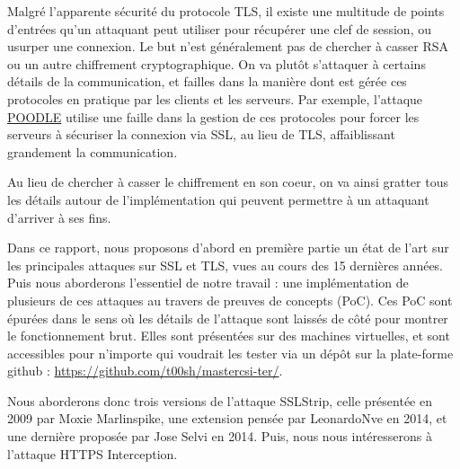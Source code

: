 Malgré l'apparente sécurité du protocole TLS, il existe une multitude de points d'entrées qu'un attaquant peut utiliser pour récupérer une clef de session, ou usurper une connexion. Le but n'est généralement pas de chercher à casser RSA ou un autre chiffrement cryptographique. On va plutôt s'attaquer à certains détails de la communication, et failles dans la manière dont est gérée ces protocoles en pratique par les clients et les serveurs. Par exemple, l'attaque \hyperref[sec:poodle]{POODLE} utilise une faille dans la gestion de ces protocoles pour forcer les serveurs à sécuriser la connexion via SSL, au lieu de TLS, affaiblissant grandement la communication.

Au lieu de chercher à casser le chiffrement en son coeur, on va ainsi gratter tous les détails autour de l'implémentation qui peuvent permettre à un attaquant d'arriver à ses fins.

Dans ce rapport, nous proposons d'abord en première partie un état de l'art sur les principales attaques sur SSL et TLS, vues au cours des 15 dernières années. Puis nous aborderons l'essentiel de notre travail : une implémentation de plusieurs de ces attaques au travers de preuves de concepts (PoC). Ces PoC sont épurées dans le sens où les détails de l'attaque sont laissés de côté pour montrer le fonctionnement brut. Elles sont présentées sur des machines virtuelles, et sont accessibles pour n'importe qui voudrait les tester via un dépôt sur la plate-forme github : \url{https://github.com/t00sh/mastercsi-ter/}.

Nous aborderons donc trois versions de l'attaque SSLStrip, celle présentée en 2009 par Moxie Marlinspike, une extension pensée par LeonardoNve en 2014, et une dernière proposée par Jose Selvi en 2014. Puis, nous nous intéresserons à l'attaque HTTPS Interception.
